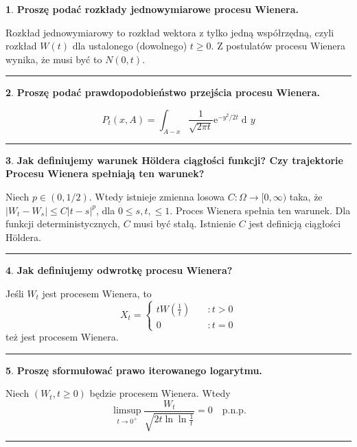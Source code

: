 \documentclass[
    twocolumn,
    twoside,
    fontsize=11pt,
    paper=A0,
    DIV=30
]{scrartcl}
\theoremstyle{definition}
\newtheorem{pytanie}{}
\theoremstyle{break}
\newenvironment{odpowiedź}{\vspace{-0.7em}}{\vspace{0.3em}\hrule}
\newcommand*{\e}{\mathrm{e}}
\DeclareMathOperator{\diff}{d\!}
\begin{document}
\begin{pytanie}
\textbf{Proszę podać rozkłady jednowymiarowe procesu Wienera.}
\end{pytanie}
\begin{odpowiedź}
    Rozkład jednowymiarowy to rozkład wektora z tylko jedną współrzędną,
    czyli rozkład $W(t)$ dla ustalonego (dowolnego) $t \geq 0$.
    Z postulatów procesu Wienera wynika, że musi być to $N(0, t)$.
\end{odpowiedź}


\begin{pytanie}
\textbf{Proszę podać prawdopodobieństwo przejścia procesu Wienera.}
\end{pytanie}
\begin{odpowiedź}
\[
    P_t(x, A) = \int_{A - x}\frac 1 {\sqrt{2\pi t}} \e^{-y^2/2t} \diff y
\] 
\end{odpowiedź}


\begin{pytanie}
\textbf{Jak definiujemy warunek Höldera ciągłości funkcji? Czy trajektorie Procesu Wienera spełniają ten warunek?}
\end{pytanie}
\begin{odpowiedź}
    Niech $p \in (0, 1/2)$. Wtedy istnieje zmienna losowa
    $C: \Omega \to [0, \infty)$ taka, że
    $|W_t - W_s| \leq  C|t - s|^p$, dla $0 \leq s, t, \leq 1$.
    Proces Wienera spełnia ten warunek. Dla funkcji deterministycznych,
    $C$ musi być stałą. Istnienie $C$ jest definicją ciągłości Höldera.
\end{odpowiedź}


\begin{pytanie}
\textbf{Jak definiujemy odwrotkę procesu Wienera?}
\end{pytanie}
\begin{odpowiedź}
    Jeśli $W_t$ jest procesem Wienera, to \[
    X_t = \begin{cases}
        tW\left(\frac 1 t\right) \quad &:t>0 \\
        0 \quad &: t = 0
        \end{cases}
    \] też jest procesem Wienera.
\end{odpowiedź}


\begin{pytanie}
\textbf{Proszę sformułować prawo iterowanego logarytmu.}
\end{pytanie}
\begin{odpowiedź}
    Niech $(W_t, t \geq 0)$ będzie procesem Wienera. Wtedy \[
    \limsup_{t \to 0^+} \frac {W_t} {\sqrt{2t \ln \ln \frac 1 t}}
    = 0 \quad \text{p.n.p.}
    \]
\end{odpowiedź}
\end{document}
